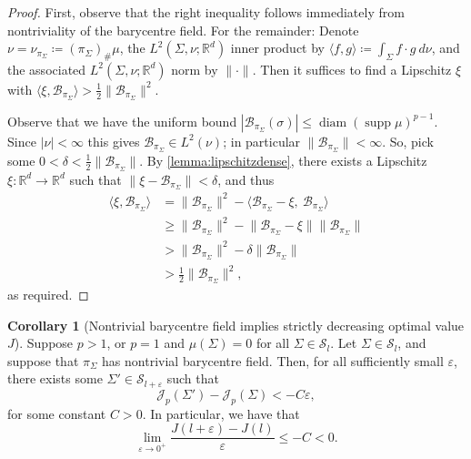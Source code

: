 \documentclass[preprint, reqno]{amsart}
\DeclareMathOperator*{\supp}{supp}
\DeclareMathOperator*{\diam}{diam}
\renewcommand{\epsilon}{\varepsilon}
\theoremstyle{definition}
\newtheorem{corollary}[definition]{Corollary}
\numberwithin{equation}{section}
\begin{document}
\begin{proof}
  First, observe that the right inequality follows immediately from
  nontriviality of the barycentre field. For the remainder: Denote
  $\nu = \nu_{\pi_{\Sigma}}\coloneqq (\pi_{\Sigma})_{\#}\mu$, the
  $L^2(\Sigma, \nu; \mathbb{R}^d)$ inner product by $\langle f,g
  \rangle \coloneqq \int_\Sigma f \cdot g\ d\nu$, and the associated
  $L^2(\Sigma, \nu; \mathbb{R}^d)$ norm by $\lVert \cdot \rVert$. Then
  it suffices to find a Lipschitz $\xi$ with $\langle \xi, \mathcal
  B_{\pi_\Sigma} \rangle > \frac{1}{2} \lVert \mathcal B_{\pi_\Sigma}
  \rVert^2$.

  Observe that we have the uniform bound
  $|\mathcal B_{\pi_\Sigma} (\sigma)| \leq \diam(\supp
  \mu)^{p-1}$. Since $|\nu| < \infty$ this gives $\mathcal
  B_{\pi_\Sigma} \in L^2(\nu)$; in particular $\lVert \mathcal
  B_{\pi_\Sigma} \rVert < \infty$. So, pick some $0 < \delta
  < \frac{1}{2}  \lVert \mathcal B_{\pi_\Sigma} \rVert$. By
  \cref{lemma:lipschitzdense}, there exists a Lipschitz $\xi :
  \mathbb{R}^d \to \mathbb{R}^d$ such that $ \lVert \xi - \mathcal
  B_{\pi_\Sigma} \rVert < \delta$, and thus
  \begin{align*}
    \langle \xi, \mathcal B_{\pi_\Sigma} \rangle
    & = \lVert \mathcal B_{\pi_\Sigma} \rVert^2 -
      \langle \mathcal B_{\pi_\Sigma} - \xi,\ \mathcal
      B_{\pi_\Sigma} \rangle \\
    & \geq \lVert \mathcal B_{\pi_\Sigma} \rVert^2 -
      \lVert \mathcal B_{\pi_\Sigma} - \xi
      \rVert \lVert \mathcal B_{\pi_\Sigma}
      \rVert \\
    & > \lVert \mathcal B_{\pi_\Sigma} \rVert^2 - \delta \lVert
      \mathcal B_{\pi_\Sigma} \rVert \\
    & > \frac{1}{2} \lVert \mathcal B_{\pi_\Sigma} \rVert^2,
  \end{align*}
  as required.
\end{proof}

\begin{corollary}[Nontrivial barycentre field implies strictly
  decreasing optimal value $J$]
  \label{ifbarycentrenontrivial}
  Suppose $p > 1$, or $p =1$ and $\mu(\Sigma) = 0$ for all $\Sigma \in
  \mathcal{S}_l$. Let $\Sigma \in \mathcal{S}_l$, and suppose that
  $\pi_{\Sigma}$ has nontrivial barycentre field. Then, for all
  sufficiently small $\epsilon$, there exists some $\Sigma' \in
  \mathcal{S}_{l + \epsilon}$ such that
  \[
    \mathscr{J}_p(\Sigma') - \mathscr{J}_p(\Sigma) < - C \epsilon,
  \]
  for some constant $C > 0$. In particular, we have that
  \[
    \lim_{\epsilon \to 0^+} \frac{J(l + \epsilon) - J(l)}{\epsilon}
    \leq - C < 0.
  \]
\end{corollary}
\end{document}
